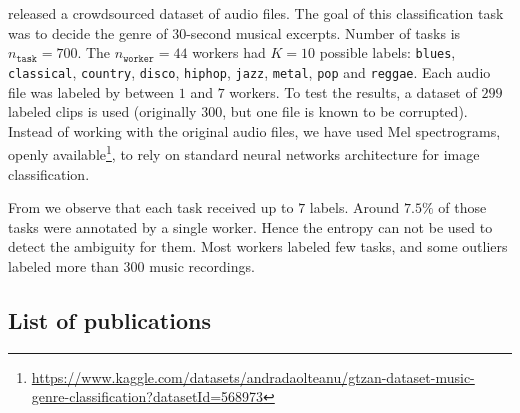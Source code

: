 \citet{rodrigues2014gaussian} released a crowdsourced dataset of audio files.
The goal of this classification task was to decide the genre of $ 30$-second musical excerpts. Number of tasks is $n_{\texttt{task}}=700$.
The $n_{\texttt{worker}}=44$ workers had $K=10$ possible labels: \texttt{blues}, \texttt{classical}, \texttt{country}, \texttt{disco}, \texttt{hiphop}, \texttt{jazz}, \texttt{metal}, \texttt{pop} and \texttt{reggae}.
Each audio file was labeled by between $1$ and $7$ workers.
To test the results, a dataset of $299$ labeled clips is used (originally $300$, but one file is known to be corrupted).
Instead of working with the original audio files, we have used Mel spectrograms, openly available\footnote{ \scriptsize \url{https://www.kaggle.com/datasets/andradaolteanu/gtzan-dataset-music-genre-classification?datasetId=568973}}, to rely on standard neural networks architecture for image classification.

From  we observe that each task received up to $7$ labels. Around $7.5\%$ of those tasks were annotated by a single worker. Hence the entropy can not be used to detect the ambiguity for them.
Most workers labeled few tasks, and some outliers labeled more than $300$ music recordings.

\subsection{List of publications}


